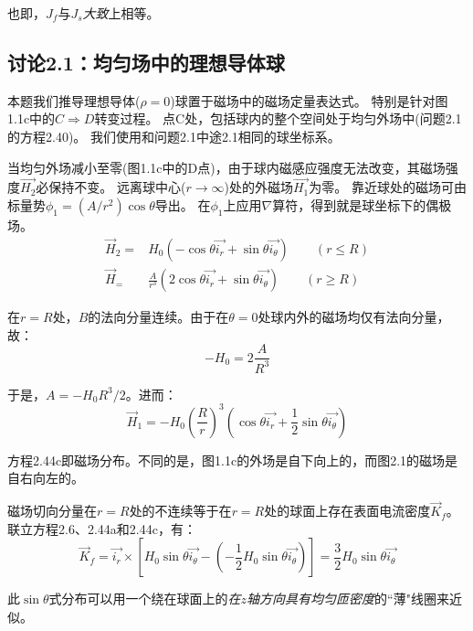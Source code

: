 也即，$J_f$与$J_s$\textit{大致}上相等。



\subsection{讨论2.1：均匀场中的理想导体球}
本题我们推导理想导体($\rho=0$)球置于磁场中的磁场定量表达式。
特别是针对图 1.1c中的$C\Rightarrow D$转变过程。
点C处，包括球内的整个空间处于均匀外场中(问题2.1的方程2.40)。
我们使用和问题2.1中途2.1相同的球坐标系。

当均匀外场减小至零(图1.1c中的D点)，由于球内磁感应强度无法改变，其磁场强度$\vec{H_2}$必保持不变。
远离球中心($r\rightarrow \infty$)处的外磁场$\vec{H_1}$为零。
靠近球处的磁场可由标量势$\phi_1=(A/r^2)\cos\theta$导出。
在$\phi_1$上应用$\nabla$算符，得到就是球坐标下的偶极场。
\begin{subequations}
	\begin{align}
\vec{H}_2=&H_0 (-\cos\theta \vec{i_r}+\sin\theta \vec{i_\theta})  \qquad(r\le R) \\
\vec{H}_=&\frac{A}{r^3}(2\cos\theta \vec{i_r}+\sin\theta \vec{i_\theta})\qquad  (r\ge R)
	\end{align}
\end{subequations}

在$r=R$处，$B$的法向分量连续。由于在$\theta=0$处球内外的磁场均仅有法向分量，故：
\begin{equation*}
-H_0=2\frac{A}{R^3}
\end{equation*}

于是，$A=-H_0 R^3/2$。进而：
\begin{equation*}
\vec{H}_1=-H_0\left(\frac{R}{r}\right)^3 \left(\cos\theta \vec{i_r}+\frac{1}{2}\sin\theta \vec{i_\theta}\right) \tag{2.44c}
\end{equation*}


方程2.44c即磁场分布。不同的是，图1.1c的外场是自下向上的，而图2.1的磁场是自右向左的。

磁场切向分量在$r=R$处的不连续等于在$r=R$处的球面上存在表面电流密度$\vec{K}_f$。
联立方程2.6、2.44a和2.44c，有：
\begin{equation}
  \vec{K}_f=\vec{i_r}\times \left[H_0 \sin\theta \vec{i_\theta}-\left(-\frac{1}{2}H_0 \sin\theta \vec{i_\theta}\right)\right]=\frac{3}{2}H_0\sin\theta\vec{i_\theta}
\end{equation}

此$\sin\theta$式分布可以用一个绕在球面上的\textit{在$z$轴方向具有均匀匝密度}的``薄"线圈来近似。




